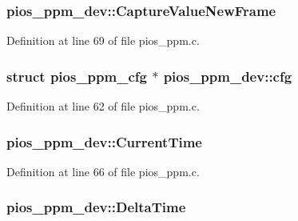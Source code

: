 \hypertarget{structpios__ppm__dev_a5fee214f001bdd57610a6db6573fbd7d}{
\subsubsection[{Capture\-Value\-New\-Frame}]{ pios\-\_\-ppm\-\_\-dev\-::\-Capture\-Value\-New\-Frame}}\label{structpios__ppm__dev_a5fee214f001bdd57610a6db6573fbd7d}


Definition at line 69 of file pios\-\_\-ppm.\-c.

\hypertarget{structpios__ppm__dev_a570855666b2b9414a8e77ad4058649ce}{
\subsubsection[{cfg}]{\setlength{\rightskip}{0pt plus 5cm}struct {\bf pios\-\_\-ppm\-\_\-cfg} $\ast$ pios\-\_\-ppm\-\_\-dev\-::cfg}}\label{structpios__ppm__dev_a570855666b2b9414a8e77ad4058649ce}


Definition at line 62 of file pios\-\_\-ppm.\-c.

\hypertarget{structpios__ppm__dev_a789b591ce1dee1c69df37405c130cd91}{
\subsubsection[{Current\-Time}]{ pios\-\_\-ppm\-\_\-dev\-::\-Current\-Time}}\label{structpios__ppm__dev_a789b591ce1dee1c69df37405c130cd91}


Definition at line 66 of file pios\-\_\-ppm.\-c.

\hypertarget{structpios__ppm__dev_a551519de53d5ad750d8e360f4fcacd53}{
\subsubsection[{Delta\-Time}]{ pios\-\_\-ppm\-\_\-dev\-::\-Delta\-Time}}\label{structpios__ppm__dev_a551519de53d5ad750d8e360f4fcacd53}


